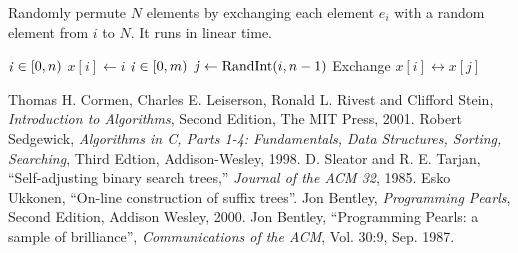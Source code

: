 \documentclass[12pt]{article}
\begin{document}
Randomly permute $N$ elements by exchanging each element $e_i$ with a
random element from $i$ to $N$.  It runs in linear time.

\begin{codebox}
\li \For $\id{i} \in [0, n)$
\li \Do $x[i] \gets i$
    \End
\li \For $\id{i} \in [0, m)$
\li \Do $\id{j} \gets \func{RandInt}(i, n-1)$
\li     Exchange $x[i] \longleftrightarrow x[j]$
    \End
\end{codebox}


\pagebreak
\begin{thebibliography}{10} %
        Thomas H. Cormen, Charles E. Leiserson, Ronald L. Rivest and
        Clifford Stein, \emph{Introduction to Algorithms}, Second Edition,
        The MIT Press, 2001.
        Robert Sedgewick, \emph{Algorithms in C, Parts 1-4: Fundamentals,
        Data Structures, Sorting, Searching}, Third Edtion, Addison-Wesley, 1998.
        D. Sleator and R. E. Tarjan, ``Self-adjusting binary search
        trees,'' \emph{Journal of the ACM 32}, 1985.
        Esko Ukkonen, ``On-line construction of suffix trees''.
        Jon Bentley, \emph{Programming Pearls}, Second Edition, Addison
        Wesley, 2000.
        Jon Bentley, ``Programming Pearls: a sample of brilliance'',
        \emph{Communications of the ACM}, Vol. 30:9, Sep. 1987.
\end{thebibliography}
\end{document}
